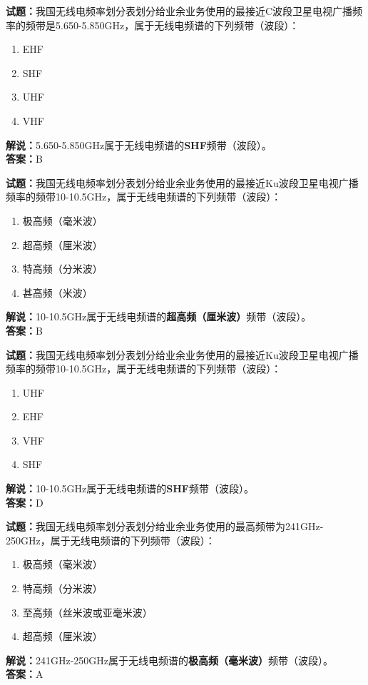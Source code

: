 \documentclass{ctexbook}
\begin{document}
\textbf{试题：}我国无线电频率划分表划分给业余业务使用的最接近C波段卫星电视广播频率的频带是5.650-5.850\unit{\GHz}，属于无线电频谱的下列频带（波段）：
\begin{enumerate}[leftmargin=3em]
  \item EHF
  \item SHF
  \item UHF
  \item VHF
\end{enumerate}
\noindent\textbf{解说：}5.650-5.850\unit{\GHz}属于无线电频谱的\textbf{SHF}频带（波段）。\\\noindent\textbf{答案：}B


\vspace{1em}

\textbf{试题：}我国无线电频率划分表划分给业余业务使用的最接近Ku波段卫星电视广播频率的频带10-10.5\unit{\GHz}，属于无线电频谱的下列频带（波段）：
\begin{enumerate}[leftmargin=3em]
  \item 极高频（毫米波）
  \item 超高频（厘米波）
  \item 特高频（分米波）
  \item 甚高频（米波）
\end{enumerate}
\noindent\textbf{解说：}10-10.5\unit{\GHz}属于无线电频谱的\textbf{超高频（厘米波）}频带（波段）。\\\noindent\textbf{答案：}B


\vspace{1em}

\textbf{试题：}我国无线电频率划分表划分给业余业务使用的最接近Ku波段卫星电视广播频率的频带10-10.5\unit{\GHz}，属于无线电频谱的下列频带（波段）：
\begin{enumerate}[leftmargin=3em]
  \item UHF
  \item EHF
  \item VHF
  \item SHF
\end{enumerate}
\noindent\textbf{解说：}10-10.5\unit{\GHz}属于无线电频谱的\textbf{SHF}频带（波段）。\\\noindent\textbf{答案：}D


\vspace{1em}

\textbf{试题：}我国无线电频率划分表划分给业余业务使用的最高频带为241\unit{\GHz}-250\unit{\GHz}，属于无线电频谱的下列频带（波段）：
\begin{enumerate}[leftmargin=3em]
  \item 极高频（毫米波）
  \item 特高频（分米波）
  \item 至高频（丝米波或亚毫米波）
  \item 超高频（厘米波）
\end{enumerate}
\noindent\textbf{解说：}241\unit{\GHz}-250\unit{\GHz}属于无线电频谱的\textbf{极高频（毫米波）}频带（波段）。\\\noindent\textbf{答案：}A
\end{document}

